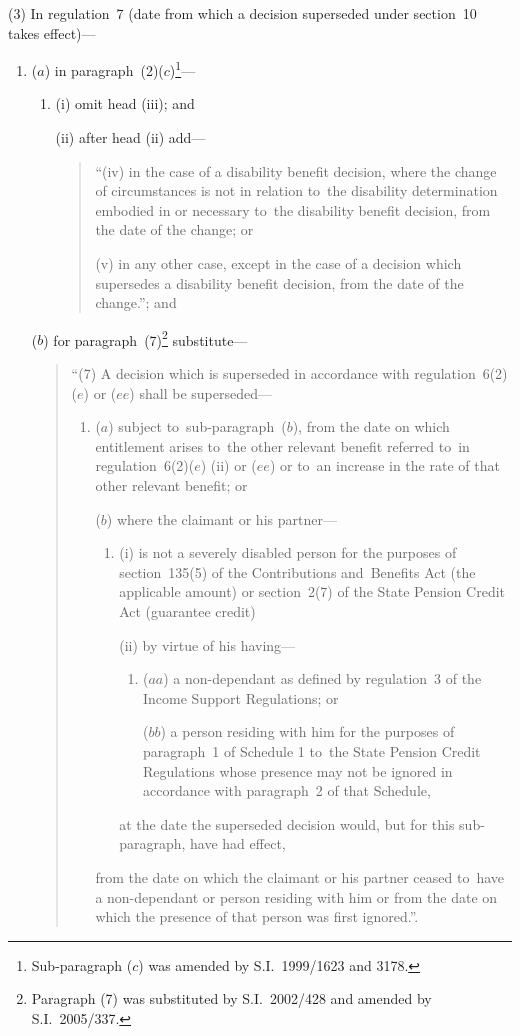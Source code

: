 \documentclass[12pt,a4paper]{article}
\begin{document}
(3) In regulation~7 (date from which a decision superseded under section~10 takes effect)—
\begin{enumerate}\item[]
($a$) in paragraph~(2)($c$)\footnote{Sub-paragraph ($c$) was amended by S.I.~1999/1623 and 3178.}—
\begin{enumerate}\item[]
(i) omit head (iii); and

(ii) after head (ii)  add—
\begin{quotation}
“(iv) in the case of a disability benefit decision, where the change of circumstances is not in relation to~the disability determination embodied in or necessary to~the disability benefit decision, from the date of the change; or

(v) in any other case, except in the case of a decision which supersedes a disability benefit decision, from the date of the change.”; and
\end{quotation}
\end{enumerate}

\enlargethispage{\baselineskip}

($b$) for paragraph~(7)\footnote{Paragraph (7) was substituted by S.I.~2002/428 and amended by S.I.~2005/337.} substitute—
\begin{quotation}
“(7) A decision which is superseded in accordance with regulation~6(2)($e$)  or ($ee$)  shall be superseded—
\begin{enumerate}\item[]
($a$) subject to~sub-paragraph~($b$), from the date on which entitlement arises to~the other relevant benefit referred to~in regulation~6(2)($e$) (ii)  or ($ee$)  or to~an increase in the rate of that other relevant benefit; or

($b$) where the claimant or his partner—
\begin{enumerate}\item[]
(i) is not a severely disabled person for the purposes of section~135(5) of the Contributions and~Benefits Act (the applicable amount) or section~2(7) of the State Pension Credit Act (guarantee credit)

(ii) by virtue of his having—
\begin{enumerate}\item[]
($aa$) a non-dependant as defined by regulation~3 of the Income Support Regulations; or

($bb$) a person residing with him for the purposes of paragraph~1 of Schedule 1 to~the State Pension Credit Regulations whose presence may not be ignored in accordance with paragraph~2 of that Schedule,
\end{enumerate}
at the date the superseded decision would, but for this sub-paragraph, have had effect,
\end{enumerate}
from the date on which the claimant or his partner ceased to~have a non-dependant or person residing with him or from the date on which the presence of that person was first ignored.”.
\end{enumerate}
\end{quotation}
\end{enumerate}
\end{document}
